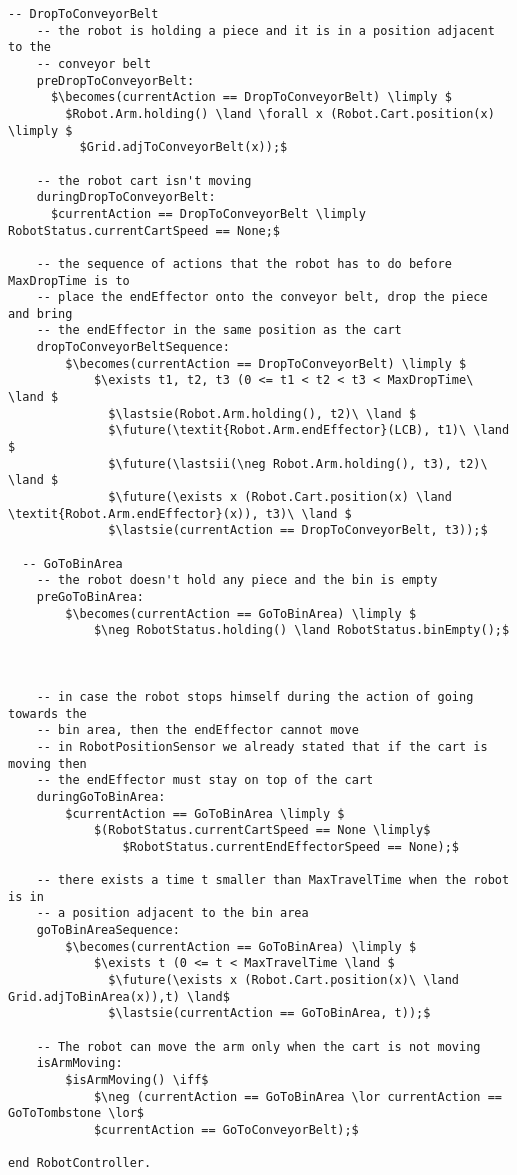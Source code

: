 \begin{lstlisting}[fontadjust, mathescape, frame=single]
  -- DropToConveyorBelt
    -- the robot is holding a piece and it is in a position adjacent to the 
    -- conveyor belt
    preDropToConveyorBelt:
      $\becomes(currentAction == DropToConveyorBelt) \limply $
        $Robot.Arm.holding() \land \forall x (Robot.Cart.position(x) \limply $
          $Grid.adjToConveyorBelt(x));$
    
    -- the robot cart isn't moving
    duringDropToConveyorBelt:
      $currentAction == DropToConveyorBelt \limply RobotStatus.currentCartSpeed == None;$

    -- the sequence of actions that the robot has to do before MaxDropTime is to 
    -- place the endEffector onto the conveyor belt, drop the piece and bring  
    -- the endEffector in the same position as the cart
    dropToConveyorBeltSequence:
        $\becomes(currentAction == DropToConveyorBelt) \limply $
            $\exists t1, t2, t3 (0 <= t1 < t2 < t3 < MaxDropTime\ \land $
              $\lastsie(Robot.Arm.holding(), t2)\ \land $
              $\future(\textit{Robot.Arm.endEffector}(LCB), t1)\ \land $
              $\future(\lastsii(\neg Robot.Arm.holding(), t3), t2)\ \land $
              $\future(\exists x (Robot.Cart.position(x) \land \textit{Robot.Arm.endEffector}(x)), t3)\ \land $
              $\lastsie(currentAction == DropToConveyorBelt, t3));$

  -- GoToBinArea
    -- the robot doesn't hold any piece and the bin is empty
    preGoToBinArea:
        $\becomes(currentAction == GoToBinArea) \limply $
            $\neg RobotStatus.holding() \land RobotStatus.binEmpty();$
    


    -- in case the robot stops himself during the action of going towards the 
    -- bin area, then the endEffector cannot move
    -- in RobotPositionSensor we already stated that if the cart is moving then 
    -- the endEffector must stay on top of the cart
    duringGoToBinArea:
        $currentAction == GoToBinArea \limply $
            $(RobotStatus.currentCartSpeed == None \limply$
                $RobotStatus.currentEndEffectorSpeed == None);$

    -- there exists a time t smaller than MaxTravelTime when the robot is in 
    -- a position adjacent to the bin area
    goToBinAreaSequence:
        $\becomes(currentAction == GoToBinArea) \limply $
            $\exists t (0 <= t < MaxTravelTime \land $
              $\future(\exists x (Robot.Cart.position(x)\ \land Grid.adjToBinArea(x)),t) \land$
              $\lastsie(currentAction == GoToBinArea, t));$
                      
    -- The robot can move the arm only when the cart is not moving
    isArmMoving: 
        $isArmMoving() \iff$
            $\neg (currentAction == GoToBinArea \lor currentAction == GoToTombstone \lor$
            $currentAction == GoToConveyorBelt);$
         
end RobotController.
\end{lstlisting}

